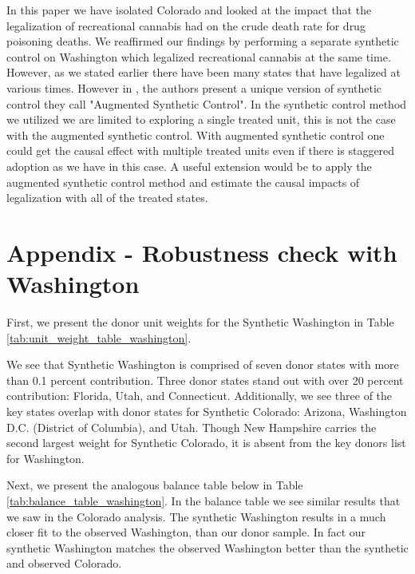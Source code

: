 \documentclass{article}
\begin{document}
In this paper we have isolated Colorado and looked at the impact that the legalization of recreational cannabis had on the crude death rate for drug poisoning deaths. We reaffirmed our findings by performing a separate synthetic control on Washington which legalized recreational cannabis at the same time. However, as we stated earlier there have been many states that have legalized at various times. However in \citet{aug-synth}, the authors present a unique version of synthetic control they call "Augmented Synthetic Control". In the synthetic control method we utilized we are limited to exploring a single treated unit, this is not the case with the augmented synthetic control. With augmented synthetic control one could get the causal effect with multiple treated units even if there is staggered adoption as we have in this case. A useful extension would be to apply the augmented synthetic control method and estimate the causal impacts of legalization with all of the treated states.

\newpage

\section{Appendix - Robustness check with Washington}

First, we present the donor unit weights for the Synthetic Washington in Table \ref{tab:unit_weight_table_washington}.



We see that Synthetic Washington is comprised of seven donor states with more than 0.1 percent contribution. Three donor states stand out with over 20 percent contribution: Florida, Utah, and Connecticut. Additionally, we see three of the key states overlap with donor states for Synthetic Colorado: Arizona, Washington D.C. (District of Columbia), and Utah. Though New Hampshire carries the second largest weight for Synthetic Colorado, it is absent from the key donors list for Washington.

Next, we present the analogous balance table below in Table \ref{tab:balance_table_washington}. In the balance table we see similar results that we saw in the Colorado analysis. The synthetic Washington results in a much closer fit to the observed Washington, than our donor sample. In fact our synthetic Washington matches the observed Washington better than the synthetic and observed Colorado. 


\end{document}
